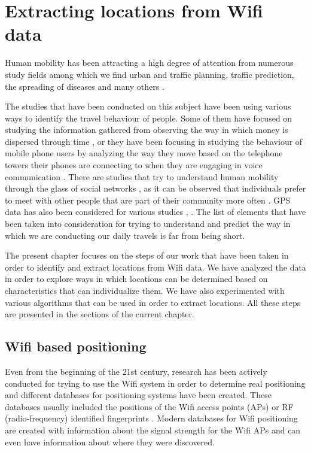 \chapter{Extracting locations from Wifi data}
\label{locations}
Human mobility has been attracting a high degree of attention from numerous
study fields among which we find urban and traffic planning, traffic prediction,
the spreading of diseases and many others \cite{AsgariGB13} \cite{Brockmann08}.

The studies that have been conducted on this subject have been using various
ways to identify the travel behaviour of people. Some of them have focused on
studying the information gathered from observing the way in which money is
dispersed through time \cite{Brockmann06}, or they have been focusing in
studying the behaviour of mobile phone users by analyzing the way they move
based on the telephone towers their phones are connecting to when they are
engaging in voice communication \cite{Barabasi08}. There are studies that try to
understand human mobility through the glass of social networks
\cite{yang2010using}, as it can be observed that individuals prefer to meet with
other people that are part of their community more often
\cite{Musolesi:2007:DMM:1317425.1317433}. GPS data has also been considered for
various studies \cite{cuttone2014inferring}, \cite{5657695}. The list of
elements that have been taken into consideration for trying to understand and
predict the way in which we are conducting our daily travels is far from being
short.

The present chapter focuses on the steps of our work that have been taken in
order to identify and extract locations from Wifi data. We have analyzed the
data in order to explore ways in which locations can be determined based on
characteristics that can individualize them. We have also experimented with
various algorithms that can be used in order to extract locations. All these
steps are presented in the sections of the current chapter.

\section{Wifi based positioning}

Even from the beginning of the $21$st century, research has been actively
conducted for trying to use the Wifi system in order to determine real
positioning and different databases for positioning systems have been created.
These databases usually included the positions of the Wifi access points (APs)
or RF (radio-frequency) identified fingerprints
\cite{Chen:2006:PMP:2166283.2166297} \cite{Cheng:2005:ACM:1067170.1067195}
\cite{Youssef:2005:HWL:1067170.1067193} \cite{bahl2000radar}. Modern databases
for Wifi positioning are created with information about the signal strength for
the Wifi APs and can even have information about where they were discovered.

